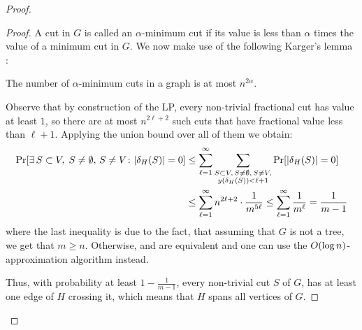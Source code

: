 \begin{proof}
\begin{proof}
        A cut in $G$ is called an $\alpha$-minimum cut if its value is less than $\alpha$ times the value of a minimum cut in $G$. 
        We now make use of the following Karger's lemma \cite{MinimumCutsInNearLinearTime, RandomSamplingInCutFlowAndNetworkDesignProblems}:
        \begin{lemma}
            The number of $\alpha$-minimum cuts in a graph is at most $n^{2\alpha}$.
        \end{lemma}
        Observe that by construction of the LP, every non-trivial fractional cut has value at least $1$, so there are at most $n^{2\ell+2}$ such cuts that have fractional value less than $\ell+1$. Applying the union bound over all of them we obtain:
\begin{align*}
    \Pr\mathopen{}\left[ \exists\, S\subset V,\; S\neq\emptyset,\, S\neq V\colon \mathopen{}\left| \delta_H\mathopen{}\left( S \right) \right|=0 \right]
    &\leq \sum_{\ell=1}^{\infty}\sum_{\substack{S\subset V,\,S\neq\emptyset,\,S\neq V,\\ y\mathopen{}\left( \delta_H\mathopen{}\left( S \right) \right)<\ell+1}}\Pr\mathopen{}\left[ \mathopen{}\left| \delta_H\mathopen{}\left( S \right) \right|=0 \right] \\
    &\leq \sum_{\ell=1}^{\infty}n^{2\ell+2}\cdot \frac{1}{m^{5\ell}} \leq \sum_{\ell=1}^{\infty}\frac{1}{m^{\ell}} = \frac{1}{m-1}
\end{align*}
where the last inequality is due to the fact, that assuming that $G$ is not a tree, we get that $m\geq n$. Otherwise, \coverage and \connectivity are equivalent and one can use the $O\mathopen{}\left( \log n \right)$-approximation algorithm instead.

Thus, with probability at least $1-\frac{1}{m-1}$, every non-trivial cut $S$ of $G$, has at least one edge of $H$ crossing it, which means that $H$ spans all vertices of $G$.
\end{proof}


\end{proof}
